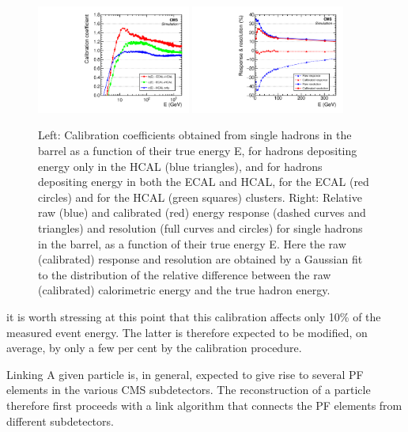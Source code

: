 \begin{figure}[htbp]
\centering
     \includegraphics[width=0.45\textwidth]{object_reconstruction_and_selection/plots/calo_calibrations.pdf}
     \includegraphics[width=0.45\textwidth]{object_reconstruction_and_selection/plots/calo_response_and_res.pdf}
     \caption{
Left: Calibration coefficients obtained from single hadrons in the barrel as a function of their true energy E, for hadrons depositing energy only in the HCAL (blue triangles), and for hadrons depositing energy in both the ECAL and HCAL, for the ECAL (red circles) and for the HCAL (green squares) clusters. Right: Relative raw (blue) and calibrated (red) energy response (dashed curves and triangles) and resolution (full curves and circles) for single hadrons in the barrel, as a function of their true energy E. Here the raw (calibrated) response and resolution are obtained by a Gaussian fit to the distribution of the relative difference between the raw (calibrated) calorimetric energy and the true hadron energy.
     }
     \label{fig:cms_slice}
\end{figure}

it is worth stressing at this point that this calibration affects only 10\% of the measured event energy. The latter is therefore expected to be modified, on average, by
only a few per cent by the calibration procedure.


Linking
A given particle is, in general, expected to give rise to several PF elements in the various CMS subdetectors. The reconstruction of a particle therefore first proceeds with a link algorithm that connects the PF elements from different subdetectors.

